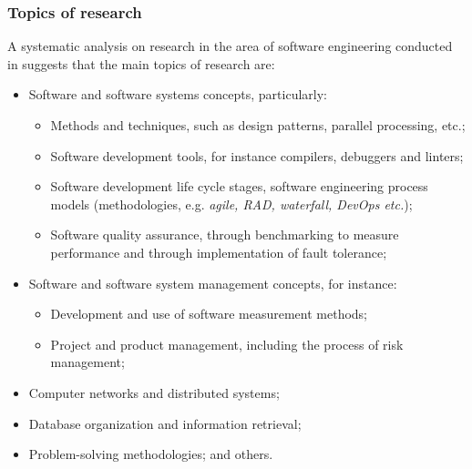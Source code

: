 \documentclass[a4paper]{article}
\begin{document}
            \subsubsection{Topics of research}

                A systematic analysis on research in the area of software engineering conducted in \cite{glass2002research} suggests that the main topics of research are:

                \begin{itemize}
                    \item Software and software systems concepts, particularly:
                        \begin{itemize}
                            \item Methods and techniques, such as design patterns, parallel processing, etc.;
                            \item Software development tools, for instance compilers, debuggers and linters;
                            \item Software development life cycle stages, software engineering process models (methodologies, e.g. \emph{agile, RAD, waterfall, DevOps etc.});
                            \item Software quality assurance, through benchmarking to measure performance and through implementation of fault tolerance;
                        \end{itemize}
                    
                    \item Software and software system management concepts, for instance:
                        \begin{itemize}
                            \item Development and use of software measurement methods;
                            \item Project and product management, including the process of risk management;
                        \end{itemize}

                    \item Computer networks and distributed systems;
                    \item Database organization and information retrieval;
                    \item Problem-solving methodologies; and others.
                    
                \end{itemize}
\end{document}
